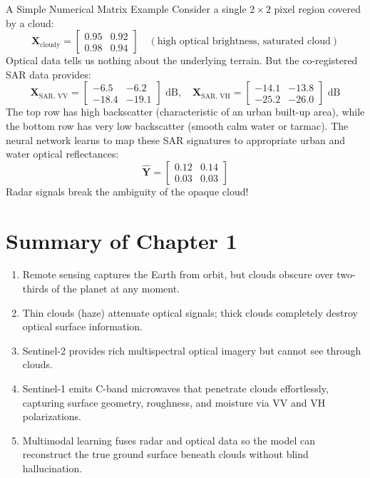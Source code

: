 \begin{mathbox}{A Simple Numerical Matrix Example}
Consider a single $2 \times 2$ pixel region covered by a cloud:
\[
\mathbf{X}_{\text{cloudy}} = \begin{bmatrix} 0.95 & 0.92 \\ 0.98 & 0.94 \end{bmatrix} \quad (\text{high optical brightness, saturated cloud})
\]
Optical data tells us nothing about the underlying terrain. But the co-registered SAR data provides:
\[
\mathbf{X}_{\text{SAR, VV}} = \begin{bmatrix} -6.5 & -6.2 \\ -18.4 & -19.1 \end{bmatrix} \text{ dB}, \quad
\mathbf{X}_{\text{SAR, VH}} = \begin{bmatrix} -14.1 & -13.8 \\ -25.2 & -26.0 \end{bmatrix} \text{ dB}
\]
The top row has high backscatter (characteristic of an urban built-up area), while the bottom row has very low backscatter (smooth calm water or tarmac). The neural network learns to map these SAR signatures to appropriate urban and water optical reflectances:
\[
\hat{\mathbf{Y}} = \begin{bmatrix} 0.12 & 0.14 \\ 0.03 & 0.03 \end{bmatrix}
\]
Radar signals break the ambiguity of the opaque cloud!
\end{mathbox}

\section{Summary of Chapter 1}
\begin{enumerate}
    \item Remote sensing captures the Earth from orbit, but clouds obscure over two-thirds of the planet at any moment.
    \item Thin clouds (haze) attenuate optical signals; thick clouds completely destroy optical surface information.
    \item Sentinel-2 provides rich multispectral optical imagery but cannot see through clouds.
    \item Sentinel-1 emits C-band microwaves that penetrate clouds effortlessly, capturing surface geometry, roughness, and moisture via VV and VH polarizations.
    \item Multimodal learning fuses radar and optical data so the model can reconstruct the true ground surface beneath clouds without blind hallucination.
\end{enumerate}

